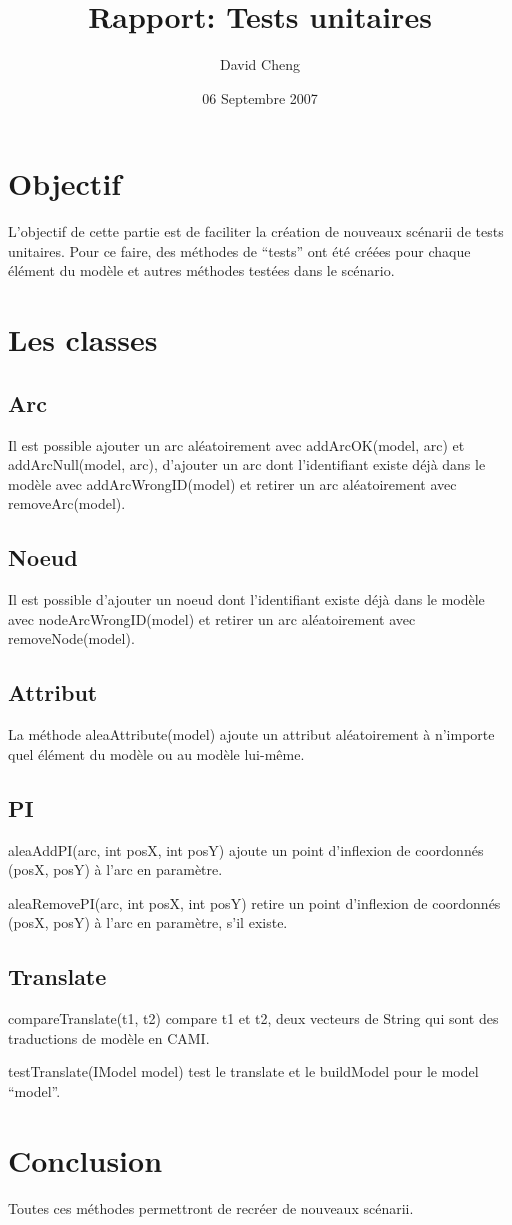 \documentclass{article}
\title{Rapport: Tests unitaires}
\author{David Cheng}
\date{06 Septembre 2007}
\begin{document}
\maketitle
\section{Objectif}

L'objectif de cette partie est de faciliter la cr\'eation de nouveaux sc\'enarii de tests unitaires.
Pour ce faire, des m\'ethodes de ``tests'' ont \'et\'e cr\'e\'ees pour chaque \'el\'ement du mod\`ele et autres m\'ethodes test\'ees dans le sc\'enario.


\section{Les classes}
\subsection{Arc}
Il est possible ajouter un arc al\'eatoirement avec addArcOK(model, arc) et addArcNull(model, arc), d'ajouter un arc dont l'identifiant existe d\'ej\`a dans le mod\`ele avec addArcWrongID(model) et retirer un arc al\'eatoirement avec removeArc(model).

\subsection{Noeud}
Il est possible d'ajouter un noeud dont l'identifiant existe d\'ej\`a dans le mod\`ele avec nodeArcWrongID(model) et retirer un arc al\'eatoirement avec removeNode(model).

\subsection{Attribut}
La m\'ethode aleaAttribute(model) ajoute un attribut al\'eatoirement \`a n'importe quel \'el\'ement du mod\`ele ou au mod\`ele lui-m\^eme.


\subsection{PI}
aleaAddPI(arc, int posX, int posY) ajoute un point d'inflexion de coordonn\'es (posX, posY) \`a l'arc en param\`etre.

aleaRemovePI(arc, int posX, int posY) retire un point d'inflexion de coordonn\'es (posX, posY) \`a l'arc en param\`etre, s'il existe.

\subsection{Translate}
compareTranslate(t1, t2) compare t1 et t2, deux vecteurs de String qui sont des traductions de mod\`ele en CAMI.

testTranslate(IModel model) test le translate et le buildModel pour le model ``model''.

\section{Conclusion}
Toutes ces m\'ethodes permettront de recr\'eer de nouveaux sc\'enarii.
\end{document}
